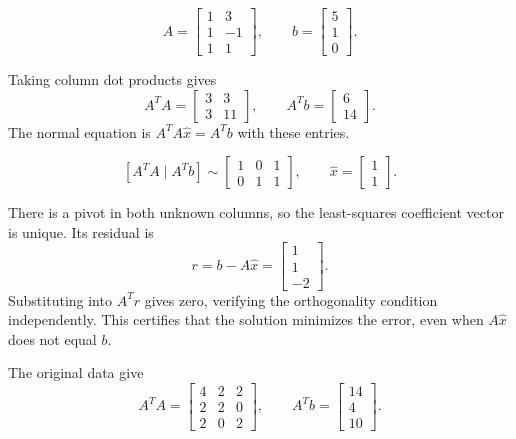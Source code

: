 \[ A=\begin{bmatrix}1 & 3\\1 & -1\\1 & 1\end{bmatrix},\qquad b=\begin{bmatrix}5\\1\\0\end{bmatrix}.\]

Taking column dot products gives
\[ A^TA=\begin{bmatrix}3 & 3\\3 & 11\end{bmatrix},\qquad A^Tb=\begin{bmatrix}6\\14\end{bmatrix}.\]
The normal equation is $A^TA\widehat x=A^Tb$ with these entries.

\[ [A^TA\mid A^Tb]\sim \begin{bmatrix}1 & 0 & 1\\0 & 1 & 1\end{bmatrix},\qquad \widehat x=\begin{bmatrix}1\\1\end{bmatrix}.\]

There is a pivot in both unknown columns, so the least-squares coefficient vector is unique. Its residual is
\[ r=b-A\widehat x=\begin{bmatrix}1\\1\\-2\end{bmatrix}.\]
Substituting into $A^Tr$ gives zero, verifying the orthogonality condition independently. This certifies that the solution minimizes the error, even when $A\widehat x$ does not equal $b$.

The original data give
\[ A^TA=\begin{bmatrix}4 & 2 & 2\\2 & 2 & 0\\2 & 0 & 2\end{bmatrix},\qquad A^Tb=\begin{bmatrix}14\\4\\10\end{bmatrix}.\]

